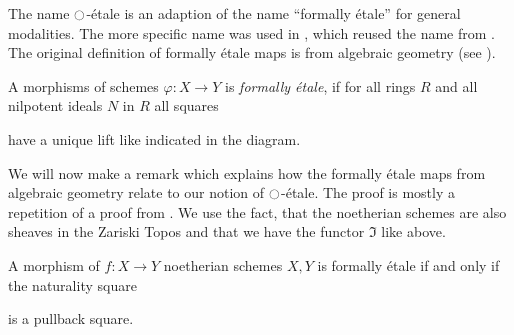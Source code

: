 \documentclass[9pt,twosided]{amsart}
\begin{document}
The name ${\ocircle}$-étale is an adaption of the name ``formally étale'' for general modalities.
The more specific name was used in \cite{wellen-thesis}, which reused the name from \cite{SyntheticPDEs}.
The original definition of formally étale maps is from algebraic geometry (see \cite[§ 17]{GrothendieckDieudonne}).
\begin{defn}
  A morphisms of schemes $\varphi:X\to Y$ is \emph{formally étale},
  if for all rings $R$ and all nilpotent ideals $N$ in $R$ all squares
  \begin{center}
  \end{center}
  have a unique lift like indicated in the diagram.
\end{defn}
We will now make a remark which explains how the formally étale maps from algebraic geometry relate to our notion of ${\ocircle}$-étale.
The proof is mostly a repetition of a proof from \cite[Section 4.4]{wellen-thesis}.
We use the fact, that the noetherian schemes are also sheaves in the Zariski Topos and that we have the functor $\Im$ like above.
\begin{rmk}
  A morphism of $f:X\to Y$ noetherian schemes $X,Y$ is formally étale if and only if the naturality square
  \begin{center}
  \end{center}
  is a pullback square.
\end{rmk}
\end{document}
